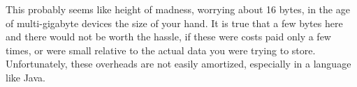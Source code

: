 This probably seems like height of madness, worrying about 16 bytes, in the age
of multi-gigabyte devices the size of your hand. It is true that a few bytes
here and there would not be worth the hassle, if these were costs paid only a
few times, or were small relative to the actual data you were trying to store.
Unfortunately, these overheads are not easily amortized, especially in a
language like Java.







\begin{comment}
After all, Java provides you with automatic garbage collection, and there are
lots of libraries and frameworks available, written by experts, that provide
powerful functionality. All you have to do is piece together the parts and let
the Java runtime system do the rest for you.

The reality, unfortunately, is very different. If you just assemble the parts, take
the defaults, and follow all the good advice to make your
program flexible and maintainable, you will likely find that your memory needs are
\emph{much} higher than imagined. You may also find that precious memory
resources are wasted holding on to data that is no longer needed, or, even
worse, that your system suffers from memory leaks. All too often, these problems
won't show up until late in the cycle, when the whole system comes together. 
You may discover, for example, when your product is about to ship, that your design is
far from fitting into memory, or that it does not support nearly the number
of users it needs to support. Fixing these problems can
take a major effort, requiring extensive refactoring or rethinking
architectural decisions, such as the choice of frameworks you use.
\end{comment}

